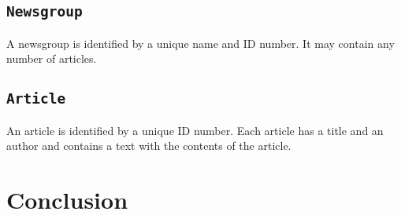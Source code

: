 \documentclass{article}
\begin{document}
\subsection{\texttt{Newsgroup}}
A newsgroup is identified by a unique name and ID number. It may contain any number of articles.

\subsection{\texttt{Article}}
An article is identified by a unique ID number. Each article has a title and an author and contains a text with the contents of the article. %

\section{Conclusion}
\end{document}
